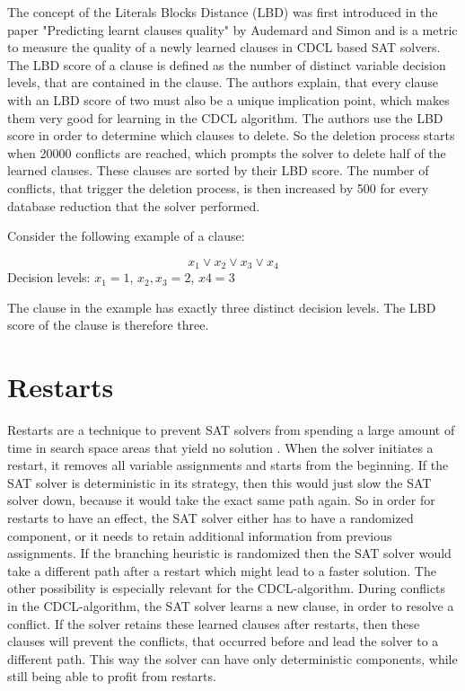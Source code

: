 The concept of the Literals Blocks Distance (LBD) was first introduced in the paper "Predicting learnt clauses quality" \cite{audemard2009predicting} by Audemard and Simon and is a metric to measure the quality of a newly learned clauses in CDCL based SAT solvers. The LBD score of a clause is defined as the number of distinct variable decision levels, that are contained in the clause. The authors explain, that every clause with an LBD score of two must also be a unique implication point, which makes them very good for learning in the CDCL algorithm. The authors use the LBD score in order to determine which clauses to delete. So the deletion process starts when 20000 conflicts are reached, which prompts the solver to delete half of the learned clauses. These clauses are sorted by their LBD score. The number of conflicts, that trigger the deletion process, is then increased by 500 for every database reduction that the solver performed.

Consider the following example of a clause:

\begin{leftbar}
\begin{center}
\begin{displaymath}
x_1 \vee x_2 \vee x_3 \vee x_4
\end{displaymath}
Decision levels: $x_1=1$, $x_2,x_3=2$, $x4=3$ 
\end{center}
\end{leftbar}

The clause in the example has exactly three distinct decision levels. The LBD score of the clause is therefore three.

\section{Restarts}

Restarts are a technique to prevent SAT solvers from spending a large amount of time in search space areas that yield no solution \cite{biere2009handbook}. When the solver initiates a restart, it removes all variable assignments and starts from the beginning. If the SAT solver is deterministic in its strategy, then this would just slow the SAT solver down, because it would take the exact same path again. So in order for restarts to have an effect, the SAT solver either has to have a randomized component, or it needs to retain additional information from previous assignments. If the branching heuristic is randomized then the SAT solver would take a different path after a restart which might lead to a faster solution. The other possibility is especially relevant for the CDCL-algorithm. During conflicts in the CDCL-algorithm, the SAT solver learns a new clause, in order to resolve a conflict. If the solver retains these learned clauses after restarts, then these clauses will prevent the conflicts, that occurred before and lead the solver to a different path. This way the solver can have only deterministic components, while still being able to profit from restarts. \cite{biere2009handbook}

